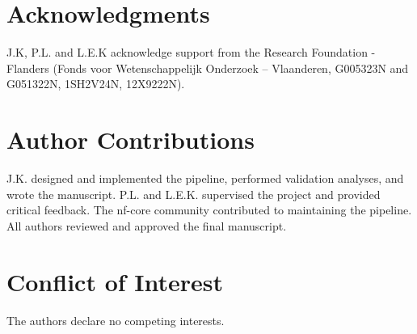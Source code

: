 \section*{Acknowledgments}
 J.K, P.L. and L.E.K  acknowledge support from the Research Foundation - Flanders (Fonds voor Wetenschappelijk Onderzoek – Vlaanderen, G005323N and G051322N, 1SH2V24N, 12X9222N).

\section*{Author Contributions}
J.K. designed and implemented the pipeline, performed validation analyses, and wrote the manuscript. P.L. and L.E.K. supervised the project and provided critical feedback. The nf-core community contributed to maintaining the pipeline. All authors reviewed and approved the final manuscript.

\section*{Conflict of Interest}
The authors declare no competing interests.

